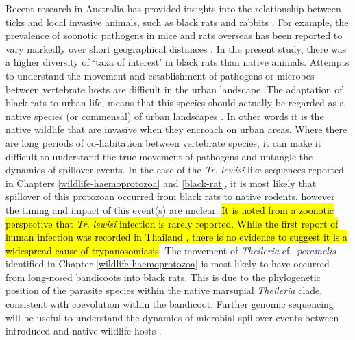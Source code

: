 \documentclass[a4paper, nobind]{templates/ociamthesis}
\begin{document}
Recent research in Australia has provided insights into the relationship between ticks and local invasive animals, such as black rats and rabbits \autocite{lydeckerPeriurbanBlackRats2019,taylorInvasiveRabbitsHost2020}.
For example, the prevalence of zoonotic pathogens in mice and rats overseas has been reported to vary markedly over short geographical distances \autocite{rothenburgerEnvironmentalFactorsZoonotic2017}.
In the present study, there was a higher diversity of `taxa of interest' in black rats than native animals.
Attempts to understand the movement and establishment of pathogens or microbes between vertebrate hosts are difficult in the urban landscape.
The adaptation of black rats to urban life, means that this species should actually be regarded as a native species (or commensal) of urban landscapes \autocite{banksEcologicalImpactsCommensal2015}.
In other words it is the native wildlife that are invasive when they encroach on urban areas.
Where there are long periods of co-habitation between vertebrate species, it can make it difficult to understand the true movement of pathogens and untangle the dynamics of spillover events.
In the case of the \emph{Tr. lewisi}-like sequences reported in Chapters \ref{wildlife-haemoprotozoa} and \ref{black-rat}, it is most likely that spillover of this protozoan occurred from black rats to native rodents, however the timing and impact of this event(s) are unclear.
\hl{It is noted from a zoonotic perspective that \emph{Tr. lewisi} infection is rarely reported. While the first report of human infection was recorded in Thailand \autocite{sarataphanDiagnosisTrypanosomaLewisilike2007}, there is no evidence to suggest it is a widespread cause of trypanosomiasis}.
The movement of \emph{Theileria} cf.~\emph{peramelis} identified in Chapter \ref{wildlife-haemoprotozoa} is most likely to have occurred from long-nosed bandicoots into black rats.
This is due to the phylogenetic position of the parasite species within the native marsupial \emph{Theileria} clade, consistent with coevolution within the bandicoot.
Further genomic sequencing will be useful to understand the dynamics of microbial spillover events between introduced and native wildlife hosts \autocite{zohdyCoevolutionEffectDriver2019}.
\end{document}

